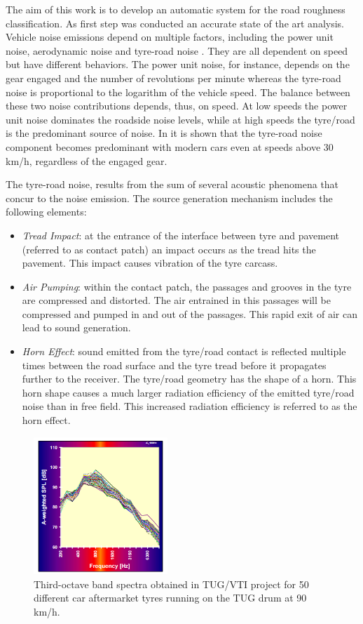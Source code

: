 The aim of this work is to develop an automatic system for the road roughness classification. As first step was conducted an accurate state of the art analysis.	
Vehicle noise emissions depend on multiple factors, including the power unit noise, aerodynamic noise and tyre-road noise \cite{hanson2004tire}. They are all dependent on speed but have different behaviors. The power unit noise, for instance, depends on the gear engaged and the number of revolutions per minute whereas the tyre-road noise is proportional to the logarithm of the vehicle speed. The balance between these two noise contributions depends, thus, on speed. 
At low speeds the power unit noise dominates the roadside noise levels, while at high speeds the tyre/road is the predominant source of noise. In \cite{sandberg2001tyre} it is shown that  the tyre-road noise component becomes predominant with modern cars even at speeds above 30 km/h, regardless of the engaged gear. 

The tyre-road noise, results from the sum of several acoustic phenomena that concur to the noise emission. The source generation mechanism includes the following elements: 
\begin{itemize}
	\item  \textit{Tread Impact}: at the entrance of the interface between tyre and pavement (referred to as contact patch) an impact occurs as the tread hits the pavement. This impact causes vibration of the tyre carcass. 
	\item \textit{Air Pumping}: within the contact patch, the passages and grooves in the tyre are compressed and distorted. The air entrained in this passages will be compressed and pumped in and out of the passages. This  rapid exit of air can lead to sound generation.
	\item \textit{Horn Effect}: sound emitted from the tyre/road contact is reflected multiple times between the road surface and the tyre tread before it propagates further to the receiver. The tyre/road geometry has the shape of a horn. This horn shape causes a much larger radiation efficiency of the emitted tyre/road noise than in free field. This increased radiation efficiency is referred to as the horn effect. 
\end{itemize}	

\begin{figure}[h]
	\centering
	\centerline{\includegraphics[width=0.45\textwidth]{img/tire.png}}
	\caption[Third-octave band noise spectra]{Third-octave band spectra obtained in TUG/VTI project for 50 different car aftermarket tyres running on the TUG drum at 90 km/h.}
	\label{fig:noise-spec}
\end{figure} 


